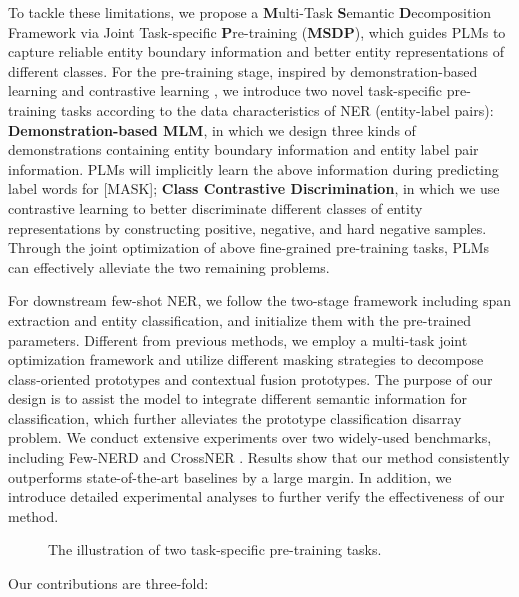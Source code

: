 \documentclass[sigconf,natbib=true,anonymous=False]{acmart}
\begin{document}
To tackle these limitations,  we propose a \textbf{M}ulti-Task \textbf{S}emantic 
\textbf{D}ecomposition Framework via Joint Task-specific \textbf{P}re-training (\textbf{MSDP}), which guides PLMs to capture reliable entity boundary information and better entity representations of different classes. For the pre-training stage, inspired by demonstration-based learning \cite{gao2020making} and contrastive learning \cite{chen2020simple}, we introduce two novel task-specific pre-training tasks according to the data characteristics of NER (entity-label pairs):
\textbf{Demonstration-based MLM}, in which we design three kinds of demonstrations containing entity boundary information and entity label pair information. PLMs will implicitly learn the above information during predicting label words for [MASK];
\textbf{Class Contrastive Discrimination}, in which we use contrastive learning to better discriminate different classes of entity representations by constructing positive, negative, and hard negative samples.
Through the joint optimization of above fine-grained pre-training tasks, PLMs can effectively alleviate the two remaining problems.

For downstream few-shot NER, we follow the two-stage framework \cite{ma2022decomposed,wang2022spanproto} including span extraction and entity classification, and initialize them with the pre-trained parameters. Different from previous methods, we employ a multi-task joint optimization framework and utilize different masking strategies to decompose class-oriented prototypes and contextual fusion prototypes. The purpose of our design is to assist the model to integrate different semantic information for classification, which further alleviates the prototype classification disarray problem. We conduct extensive experiments over two widely-used benchmarks, including Few-NERD \cite{ding2021few} and CrossNER \cite{hou2020few}. Results show that our method consistently outperforms state-of-the-art baselines by a large margin. In addition, we introduce detailed experimental analyses to further verify the effectiveness of our method.
\begin{figure*}
    \centering
    \vspace{-0.8cm}
    \caption{The illustration of two task-specific pre-training tasks.}
    \label{fig:pretrain}
    \vspace{0.2cm}
\end{figure*}
Our contributions are three-fold: 
\end{document}
